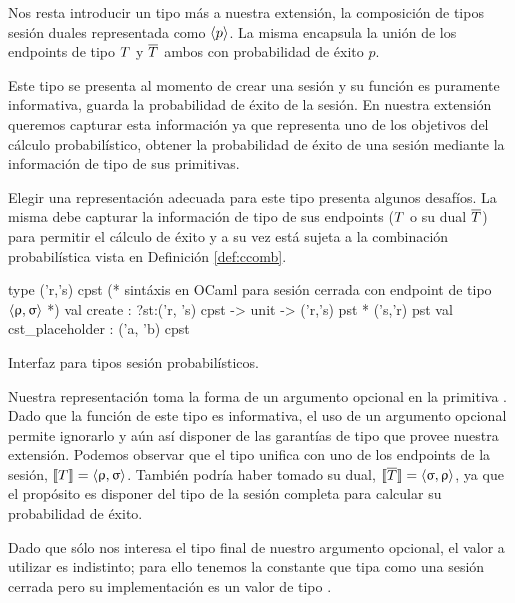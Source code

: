 \label{cap:comp_sesiones_duales}
Nos resta introducir un tipo más a nuestra extensión, la composición de tipos
sesión duales representada como $\langle p \rangle$. La misma encapsula la
unión de los endpoints de tipo $T$ y $\overline{T}$ ambos con probabilidad de éxito
$p$. 

Este tipo se presenta al momento de crear una sesión y su función es puramente
informativa, guarda la probabilidad de éxito de la sesión. En nuestra extensión
queremos capturar esta información ya que representa uno de los objetivos del
cálculo probabilístico, obtener la probabilidad de éxito de una sesión mediante
la información de tipo de sus primitivas.

Elegir una representación adecuada para este tipo presenta algunos desafíos.
La misma debe capturar la información de tipo de sus endpoints ($T$ o su
dual $\overline{T}$) para permitir el cálculo de éxito y a su vez está sujeta a la
combinación probabilística vista en Definición \ref{def:ccomb}.

\begin{table}[htb]
	\begin{OCamlD}[frame=single]
  type ('r,'s) cpst (* sintáxis en OCaml para sesión cerrada
                     con endpoint de tipo $\langle\uprho,\upsigma\rangle$ *)
  val create  : ?st:('r, 's) cpst -> unit -> ('r,'s) pst * ('s,'r) pst
  val cst_placeholder : ('a, 'b) cpst
	\end{OCamlD}
	\caption{Interfaz \OCaml para tipos sesión probabilísticos.}
	\label{tab:create_cpst_sig}
\end{table}

Nuestra representación toma la forma de un argumento opcional en la primitiva
. Dado que la función de este tipo es informativa, el uso de un
argumento opcional permite ignorarlo y aún así disponer de las garantías de
tipo que provee nuestra extensión. Podemos observar que el tipo unifica con uno
de los endpoints de la sesión, $\llbracket T\rrbracket = \langle\uprho,\upsigma\rangle$. También
podría haber tomado su dual, $\llbracket\overline{T}\rrbracket = \langle\upsigma,\uprho\rangle$, ya que
el propósito es disponer del tipo de la sesión completa para calcular su
probabilidad de éxito.

Dado que sólo nos interesa el tipo final de nuestro argumento opcional, el
valor a utilizar es indistinto; para ello tenemos la constante
 que tipa como una sesión cerrada pero su implementación es
un valor de tipo .

